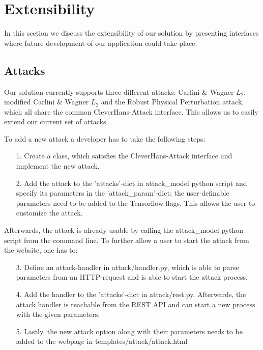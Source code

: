 
\section{Extensibility}

In this section we discuss the extensibility of our solution by presenting interfaces where future development of our application could take place.

\subsection{Attacks}
Our solution currently supports three different attacks: Carlini \& Wagner $L_2$, modified Carlini \& Wagner $L_2$ and the Robust Physical Perturbation attack, which all share the common CleverHans-Attack interface. This allows us to easily extend our current set of attacks.

To add a new attack a developer has to take the following steps:

\begin{enumerate}
\item[1.] Create a class, which satisfies the CleverHans-Attack interface and implement the new attack.
\item[2.] Add the attack to the 'attacks'-dict in attack\_model python script and specify its parameters in the 'attack\_param'-dict; the user-definable parameters need to be added to the Tensorflow flags. This allows the user to customize the attack.
\end{enumerate}

Afterwards, the attack is already usable by calling the attack\_model python script from the command line. To further allow a user to start the attack from the website, one has to:

\begin{enumerate}
\item[3.] Define an attack-handler in attack/handler.py, which is able to parse parameters from an HTTP-request and is able to start the attack process.
\item[4.] Add the handler to the 'attacks'-dict in attack/rest.py. Afterwards, the attack handler is reachable from the REST API and can start a new process with the given parameters.
\item[5.] Lastly, the new attack option along with their parameters needs to be added to the webpage in templates/attack/attack.html
\end{enumerate}


